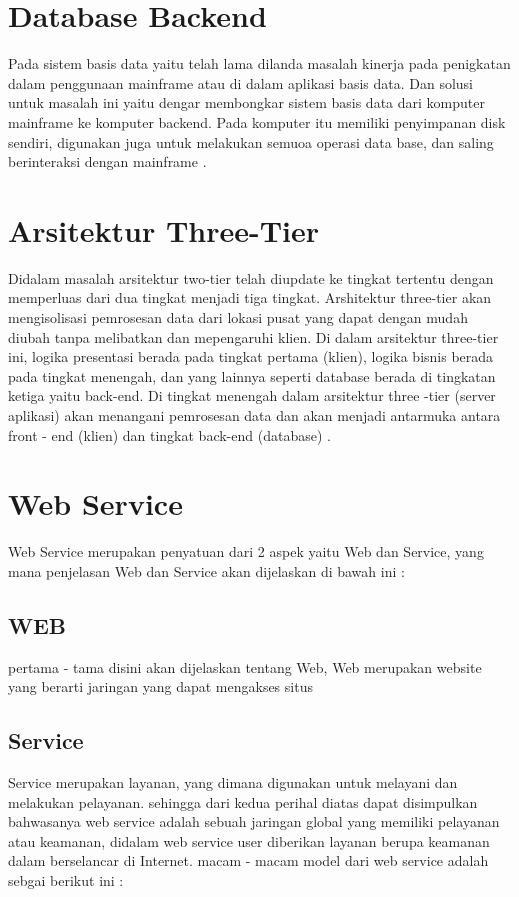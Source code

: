 \section{Database Backend}
	Pada sistem basis data yaitu telah lama dilanda masalah kinerja pada penigkatan dalam penggunaan mainframe atau di dalam aplikasi basis data. Dan solusi untuk masalah ini yaitu dengar membongkar sistem basis data dari komputer mainframe ke komputer backend. Pada komputer itu memiliki penyimpanan disk sendiri, digunakan juga untuk melakukan semuoa operasi data base, dan saling berinteraksi dengan mainframe
\cite{yousefi2008database}.


\section{Arsitektur Three-Tier}
	Didalam masalah arsitektur two-tier telah diupdate ke tingkat tertentu dengan memperluas dari dua tingkat menjadi tiga tingkat.
Arshitektur three-tier akan mengisolisasi pemrosesan data dari lokasi pusat yang dapat dengan mudah diubah tanpa melibatkan dan mepengaruhi klien. Di dalam arsitektur three-tier ini, logika presentasi berada pada tingkat pertama (klien), logika bisnis berada pada 
tingkat menengah, dan yang lainnya seperti database berada di tingkatan ketiga yaitu back-end. Di tingkat menengah dalam
arsitektur three -tier (server aplikasi) akan menangani pemrosesan data dan akan menjadi antarmuka antara front - end (klien) dan
tingkat back-end (database)
\cite{demurjian1986multi}.


\section{Web Service}
	Web Service merupakan penyatuan dari 2 aspek yaitu Web dan Service, yang mana penjelasan Web dan Service akan dijelaskan di bawah ini :

\subsection{WEB}
	pertama - tama disini akan dijelaskan tentang Web, Web merupakan website yang berarti jaringan yang dapat mengakses situs

\subsection{Service}
	Service merupakan layanan, yang dimana digunakan untuk melayani dan melakukan pelayanan.
	sehingga dari kedua perihal diatas dapat disimpulkan bahwasanya web service adalah sebuah jaringan global yang memiliki pelayanan atau keamanan,
didalam web service user diberikan layanan berupa keamanan dalam berselancar di Internet. macam - macam model dari web service adalah sebgai berikut ini :

